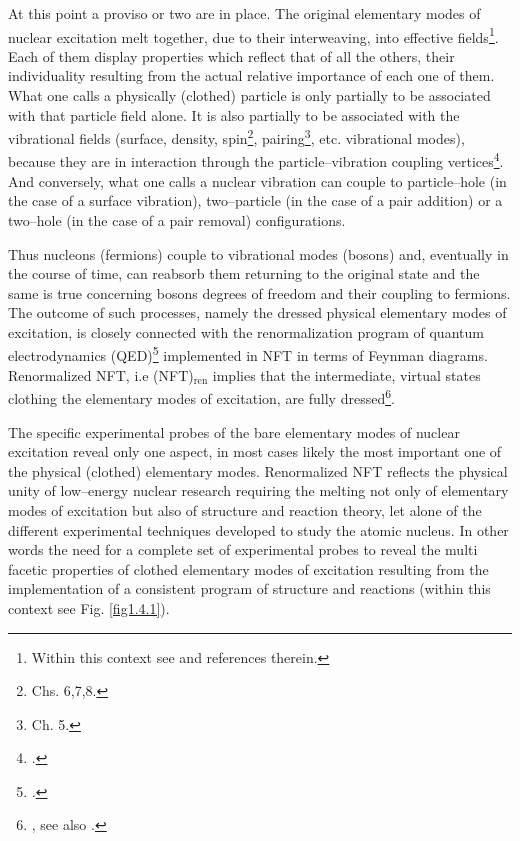 At this point a proviso or two are in place. The original elementary modes of nuclear excitation melt together, due to their interweaving, into effective fields\footnote{Within this context see \cite{Dickhoff:05} and references therein.}. Each of them display properties which reflect that of all the others, their individuality resulting from the actual relative importance of each one of them. What one calls a physically  (clothed) particle is only partially to be associated with that particle field alone. It is also partially to be associated with the  vibrational fields
 (surface, density, spin\footnote{\cite{Bertsch:05} Chs. 6,7,8.}, pairing\footnote{\cite{Brink:05} Ch. 5.}, etc. vibrational modes), 
 because they are in interaction through the particle--vibration coupling vertices\footnote{\cite{Bohr:75}.}. And conversely, what one calls a nuclear vibration can couple to  particle--hole (in the case of a surface vibration),  two--particle (in the case of a pair addition) or a two--hole (in the case of a pair removal)  configurations. 
 
 
 Thus nucleons (fermions)  couple to  vibrational modes (bosons) and, eventually   in the course of time, can reabsorb them returning to the original state and the same is true concerning bosons degrees of freedom and their coupling to fermions.  The outcome of such processes, namely the dressed physical elementary modes of excitation, is closely connected with the renormalization program of quantum electrodynamics (QED)\footnote{\cite{Feynman:75,Schwinger:01}.} implemented in NFT in terms of Feynman diagrams. Renormalized NFT, i.e (NFT)$_{\text{ren}}$ implies that the intermediate, virtual states clothing the elementary modes of excitation, are fully dressed\footnote{\cite{Barranco:17}, see also \cite{Broglia:16}.}. 
  
 
  The specific experimental probes of the bare elementary modes of nuclear excitation reveal only one aspect, in most cases likely the most important one of the physical (clothed) elementary modes. Renormalized NFT  reflects the physical unity of  low--energy nuclear research requiring the melting not only of elementary modes of excitation but also of structure and reaction theory, let alone of the different experimental techniques developed to study the atomic nucleus. In other words the need for a complete set of experimental probes to reveal the multi facetic properties of clothed elementary modes of excitation resulting  from the implementation of  a consistent program of structure and reactions (within this context see  Fig. \ref{fig1.4.1}).


